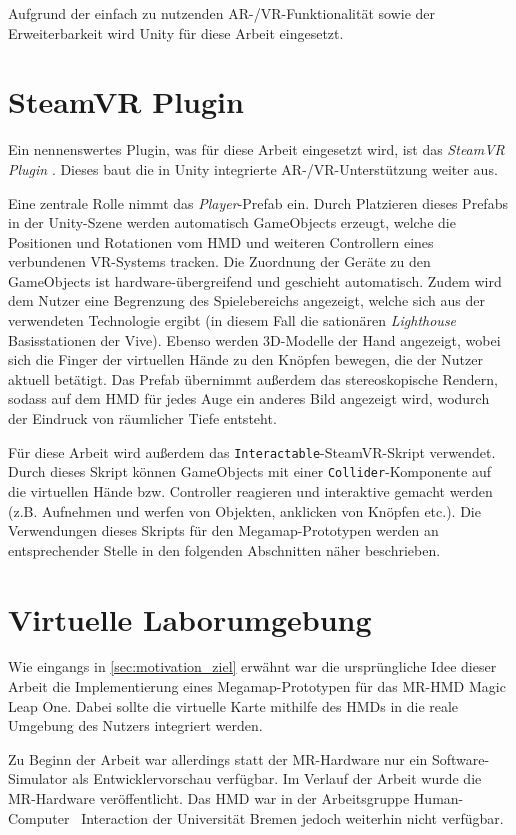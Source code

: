 Aufgrund der einfach zu nutzenden AR-/VR-Funktionalität sowie der Erweiterbarkeit wird Unity für diese Arbeit eingesetzt.

\section{SteamVR Plugin}
Ein nennenswertes Plugin, was für diese Arbeit eingesetzt wird, ist das \emph{SteamVR Plugin} \autocite{ValveCorporation2018}.
Dieses baut die in Unity integrierte AR-/VR-Unterstützung weiter aus.

Eine zentrale Rolle nimmt das \emph{Player}-Prefab ein.
Durch Platzieren dieses Prefabs in der Unity-Szene werden automatisch GameObjects erzeugt, welche die Positionen und Rotationen vom HMD und weiteren Controllern eines verbundenen VR-Systems tracken.
Die Zuordnung der Geräte zu den GameObjects ist hardware-übergreifend und geschieht automatisch.
Zudem wird dem Nutzer eine Begrenzung des Spielebereichs angezeigt, welche sich aus der verwendeten Technologie ergibt (in diesem Fall die sationären \emph{Lighthouse} Basisstationen der Vive).
Ebenso werden 3D-Modelle der Hand angezeigt, wobei sich die Finger der virtuellen Hände zu den Knöpfen bewegen, die der Nutzer aktuell betätigt.
Das Prefab übernimmt außerdem das stereoskopische Rendern, sodass auf dem HMD für jedes Auge ein anderes Bild angezeigt wird, wodurch der Eindruck von räumlicher Tiefe entsteht.

Für diese Arbeit wird außerdem das \lstinline{Interactable}-SteamVR-Skript verwendet.
Durch dieses Skript können GameObjects mit einer \lstinline{Collider}-Komponente auf die virtuellen Hände bzw. Controller reagieren und interaktive gemacht werden (z.B. Aufnehmen und werfen von Objekten, anklicken von Knöpfen etc.).
Die Verwendungen dieses Skripts für den Megamap-Prototypen werden an entsprechender Stelle in den folgenden Abschnitten näher beschrieben.

\section{Virtuelle Laborumgebung}
Wie eingangs in \autoref{sec:motivation_ziel} erwähnt war die ursprüngliche Idee dieser Arbeit die Implementierung eines Megamap-Prototypen für das MR-HMD Magic Leap One.
Dabei sollte die virtuelle Karte mithilfe des HMDs in die reale Umgebung des Nutzers integriert werden.

Zu Beginn der Arbeit war allerdings statt der MR-Hardware nur ein Software-Simulator als Entwicklervorschau verfügbar.
Im Verlauf der Arbeit wurde die MR-Hardware veröffentlicht.
Das HMD war in der Arbeitsgruppe Human-Computer~ Interaction der Universität Bremen jedoch weiterhin nicht verfügbar.

